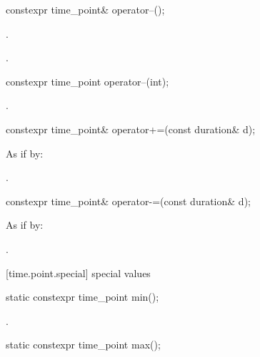 %
\begin{itemdecl}
constexpr time_point& operator--();
\end{itemdecl}

\begin{itemdescr}
\pnum
\effects {}.

\pnum
\returns {}.
\end{itemdescr}

%
\begin{itemdecl}
constexpr time_point operator--(int);
\end{itemdecl}

\begin{itemdescr}
\pnum
\returns {}.
\end{itemdescr}

%
\begin{itemdecl}
constexpr time_point& operator+=(const duration& d);
\end{itemdecl}

\begin{itemdescr}
\pnum
\effects As if by: 

\pnum
\returns {}.
\end{itemdescr}

%
\begin{itemdecl}
constexpr time_point& operator-=(const duration& d);
\end{itemdecl}

\begin{itemdescr}
\pnum
\effects As if by: 

\pnum
\returns {}.
\end{itemdescr}

[time.point.special]{ special values}

%
\begin{itemdecl}
static constexpr time_point min();
\end{itemdecl}

\begin{itemdescr}
\pnum
\returns {}.
\end{itemdescr}

%
\begin{itemdecl}
static constexpr time_point max();
\end{itemdecl}

